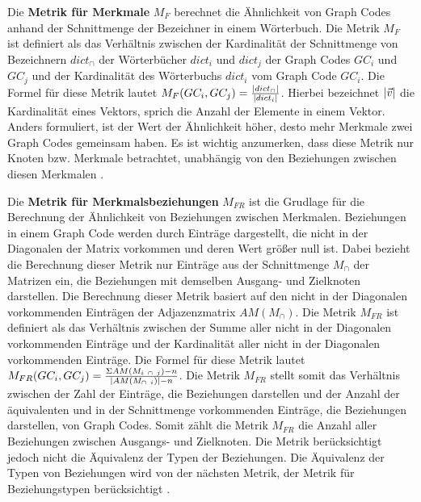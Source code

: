 
Die \textbf{Metrik für Merkmale} $M_F$ berechnet die Ähnlichkeit von Graph Codes anhand der Schnittmenge der Bezeichner in einem Wörterbuch.
Die Metrik $M_F$ ist definiert als das Verhältnis zwischen der Kardinalität der Schnittmenge von Bezeichnern $dict_{\cap}$ der Wörterbücher $dict_i$ und $dict_j$ der Graph Codes $GC_i$ und $GC_j$ und der Kardinalität des Wörterbuchs $dict_i$ vom Graph Code $GC_i$.
Die Formel für diese Metrik lautet $M_F(GC_i, GC_j) = \frac{\abs{dict_{\cap}}}{\abs{dict_i}}$.
Hierbei bezeichnet $\abs{\Vec{v}}$ die Kardinalität eines Vektors, sprich die Anzahl der Elemente in einem Vektor.
Anders formuliert, ist der Wert der Ähnlichkeit höher, desto mehr Merkmale zwei Graph Codes gemeinsam haben.
Es ist wichtig anzumerken, dass diese Metrik nur Knoten bzw. Merkmale betrachtet, unabhängig von den Beziehungen zwischen diesen Merkmalen \cite{gc-2d-proj-mmfg}.

Die \textbf{Metrik für Merkmalsbeziehungen} $M_{FR}$ ist die Grudlage für die Berechnung der Ähnlichkeit von Beziehungen zwischen Merkmalen.
Beziehungen in einem Graph Code werden durch Einträge dargestellt, die nicht in der Diagonalen der Matrix vorkommen und deren Wert größer null ist.
Dabei bezieht die Berechnung dieser Metrik nur Einträge aus der Schnittmenge $M_{\cap}$ der Matrizen ein, die Beziehungen mit demselben Ausgang- und Zielknoten darstellen.
Die Berechnung dieser Metrik basiert auf den nicht in der Diagonalen vorkommenden Einträgen der Adjazenzmatrix $AM(M_{\cap})$.
Die Metrik $M_{FR}$ ist definiert als das Verhältnis zwischen der Summe aller nicht in der Diagonalen vorkommenden Einträge und der Kardinalität aller nicht in der Diagonalen vorkommenden Einträge.
Die Formel für diese Metrik lautet $M_{FR}(GC_i, GC_j) = \frac{\Sigma AM(M_{i~\cap~j}) -n}{\abs{AM(M_{\cap~i})} - n}$.
Die Metrik $M_{FR}$ stellt somit das Verhältnis zwischen der Zahl der Einträge, die Beziehungen darstellen und der Anzahl der äquivalenten und in der Schnittmenge vorkommenden Einträge, die Beziehungen darstellen, von Graph Codes.
Somit zählt die Metrik $M_{FR}$ die Anzahl aller Beziehungen zwischen Ausgangs- und Zielknoten.
Die Metrik berücksichtigt jedoch nicht die Äquivalenz der Typen der Beziehungen.
Die Äquivalenz der Typen von Beziehungen wird von der nächsten Metrik, der Metrik für Beziehungstypen berücksichtigt \cite{gc-2d-proj-mmfg}.

